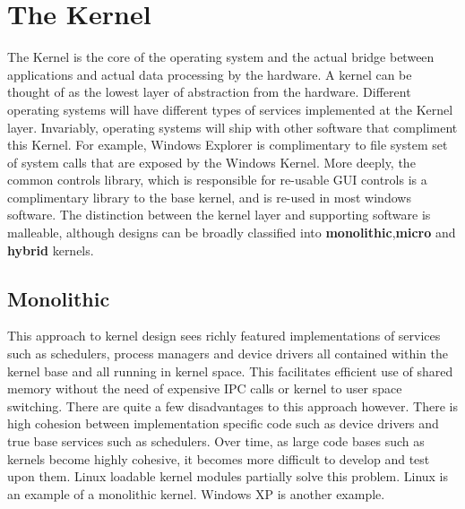 \documentclass[10pt,a4paper]{article}
\begin{document}
\section{The Kernel}
The Kernel is the core of the operating system and the actual bridge between applications and actual data processing by the hardware. A kernel can be thought of as the lowest layer of abstraction from the hardware. Different operating systems will have different types of services implemented at the Kernel layer. Invariably, operating systems will ship with other software that compliment this Kernel. For example, Windows Explorer is complimentary to file system set of system calls that are exposed by the Windows Kernel. More deeply, the common controls library, which is responsible for re-usable GUI controls is a complimentary library to the base kernel, and is re-used in most windows software. The distinction between the kernel layer and supporting software is malleable, although designs can be broadly classified into {\bf monolithic},{\bf micro} and {\bf hybrid} kernels. 
\subsection{Monolithic}
This approach to kernel design sees richly featured implementations of services such as schedulers, process managers and device drivers all contained within the kernel base and all running in kernel space. This facilitates efficient use of shared memory without the need of expensive IPC calls or kernel to user space switching. There are quite a few disadvantages to this approach however. There is high cohesion between implementation specific code such as device drivers and true base services such as schedulers. Over time, as large code bases such as kernels become highly cohesive, it becomes more difficult to develop and test upon them. Linux loadable kernel modules partially solve this problem. Linux is an example of a monolithic kernel. Windows XP is another example. 
\end{document}

